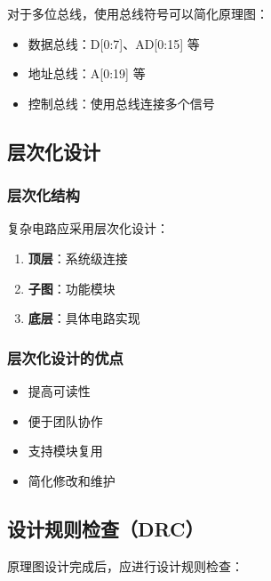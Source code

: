 对于多位总线，使用总线符号可以简化原理图：

\begin{itemize}
  \item 数据总线：D[0:7]、AD[0:15] 等
  \item 地址总线：A[0:19] 等
  \item 控制总线：使用总线连接多个信号
\end{itemize}

\subsection{层次化设计}

\subsubsection{层次化结构}

复杂电路应采用层次化设计：

\begin{enumerate}
  \item \textbf{顶层}：系统级连接
  \item \textbf{子图}：功能模块
  \item \textbf{底层}：具体电路实现
\end{enumerate}

\subsubsection{层次化设计的优点}

\begin{itemize}
  \item 提高可读性
  \item 便于团队协作
  \item 支持模块复用
  \item 简化修改和维护
\end{itemize}

\subsection{设计规则检查（DRC）}

原理图设计完成后，应进行设计规则检查：

